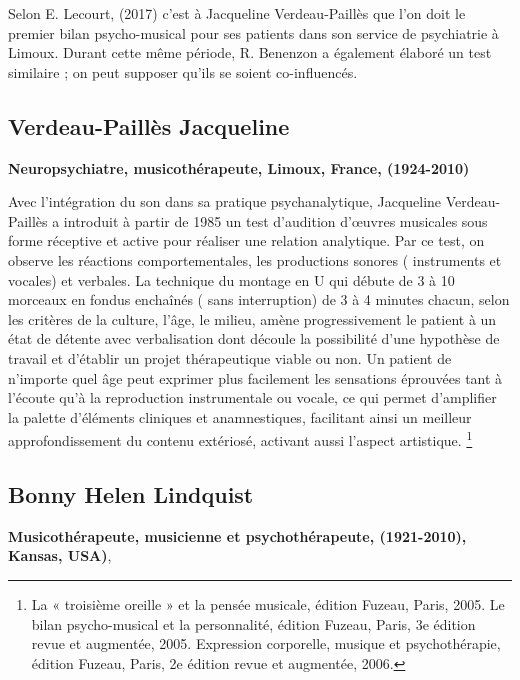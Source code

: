        Selon E. Lecourt,
(2017)\autocite[ch.~3, p.~84]{Les arts-thérapies,Ed.Armand-Colin}
c'est à Jacqueline Verdeau-Paillès que l'on doit le premier bilan psycho-musical pour ses patients dans son service
de psychiatrie à Limoux. Durant cette même période, R.
Benenzon a également élaboré un test similaire \autocite{benenzon:musicotherapie}; on peut supposer qu'ils se soient co-influencés. 


	


\subsection{Verdeau-Paillès Jacqueline
}
\textbf{Neuropsychiatre,
  musicothérapeute, Limoux, France, (1924-2010)}

Avec l'intégration du son dans sa pratique psychanalytique, 
Jacqueline Verdeau-Paillès a introduit  à partir de 1985  un test d'audition d'\oe uvres musicales
sous forme réceptive et active pour réaliser
une relation analytique\autocite{verdeau-pailles:bilan}.
Par ce test, on
observe les réactions comportementales, les productions sonores (
instruments et vocales) et verbales. La technique du montage en U qui débute de 3 à 10
morceaux en fondus enchaînés ( sans interruption) de 3 à 4 minutes chacun, selon les
critères de la culture, l'âge, le milieu,
amène progressivement le patient à un état de détente
avec verbalisation dont découle la possibilité 
d'une hypothèse de
travail et d'établir un projet thérapeutique viable ou non.
Un patient de n'importe quel âge peut exprimer plus facilement les
sensations éprouvées tant à l'écoute qu'à la reproduction
instrumentale ou vocale, ce qui permet d'amplifier la palette d'éléments
cliniques et anamnestiques, facilitant ainsi un meilleur approfondissement du
contenu extériosé, activant aussi l'aspect artistique.
\footnote{ La « troisième oreille » et la pensée musicale, édition Fuzeau, Paris, 2005.
Le bilan psycho-musical et la personnalité, édition Fuzeau, Paris, 3e édition revue et augmentée, 2005.
Expression corporelle, musique et psychothérapie, édition Fuzeau,
Paris, 2e édition revue et augmentée, 2006.} 



\subsection{Bonny Helen Lindquist} 

\textbf{ Musicothérapeute,
  musicienne et psychothérapeute, (1921-2010), Kansas, USA)},

